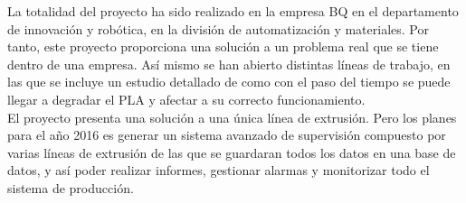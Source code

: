 La totalidad del proyecto ha sido realizado en la empresa BQ en el departamento de innovación y robótica, en la división de automatización y materiales. Por tanto, este proyecto proporciona una solución a un problema real que se tiene dentro de una empresa. Así mismo se han abierto distintas líneas de trabajo, en las que se incluye un estudio detallado de como con el paso del tiempo se puede llegar a degradar el PLA y afectar a su correcto funcionamiento.\\

El proyecto presenta una solución a una única línea de extrusión. Pero los planes para el año 2016 es generar un sistema avanzado de supervisión compuesto por varias líneas de extrusión de las que se guardaran todos los datos en una base de datos, y así poder realizar informes, gestionar alarmas y monitorizar todo el sistema de producción.

